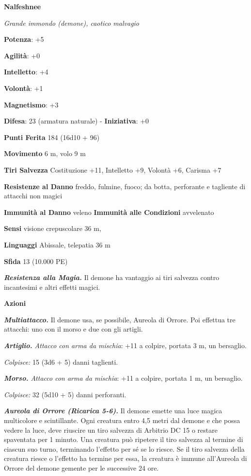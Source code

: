\begin{multicols}{2}
\textbf{Nalfeshnee}

\emph{Grande immondo (demone), caotico malvagio}

\textbf{Potenza}: +5

\textbf{Agilità}: +0

\textbf{Intelletto}: +4

\textbf{Volontà}: +1

\textbf{Magnetismo}: +3

\textbf{Difesa}: 23 (armatura naturale) - \textbf{Iniziativa}: +0

\textbf{Punti Ferita} 184 (16d10 + 96)

\textbf{Movimento} 6 m, volo 9 m

\textbf{Tiri Salvezza} Costituzione +11, Intelletto +9, Volontà +6,
Carisma +7

\textbf{Resistenze al Danno} freddo, fulmine, fuoco; da botta,
perforante e tagliente di attacchi non magici

\textbf{Immunità al Danno} veleno \textbf{Immunità alle Condizioni}
avvelenato

\textbf{Sensi} visione crepuscolare 36 m, 

\textbf{Linguaggi} Abissale, telepatia 36 m 

\textbf{Sfida} 13 (10.000 PE)\smallskip

\emph{\textbf{Resistenza alla Magia.}} Il demone ha vantaggio ai tiri
salvezza contro incantesimi e altri effetti magici.

\smallskip\textbf{Azioni}

\emph{\textbf{Multiattacco.}} Il demone usa, se possibile, Aureola di
Orrore. Poi effettua tre attacchi: uno con il morso e due con gli
artigli.

\emph{\textbf{Artiglio.} Attacco con arma da mischia}: +11 a colpire,
portata 3 m, un bersaglio.

\emph{Colpisce:} 15 (3d6 + 5) danni taglienti.

\emph{\textbf{Morso.} Attacco con arma da mischia}: +11 a colpire,
portata 1 m, un bersaglio.

\emph{Colpisce:} 32 (5d10 + 5) danni perforanti.

\emph{\textbf{Aureola di Orrore (Ricarica 5-6).}} Il demone emette una
luce magica multicolore e scintillante. Ogni creatura entro 4,5 metri
dal demone e che possa vedere la luce, deve riuscire un tiro salvezza di Arbitrio DC 15 o restare spaventata per 1 minuto. Una creatura può
ripetere il tiro salvezza al termine di ciascun suo turno, terminando
l'effetto per sé se lo riesce. Se il tiro salvezza della creatura riesce
o l'effetto ha termine per essa, la creatura è immune all'Aureola di
Orrore del demone gemente per le successive 24 ore.


\end{multicols}
